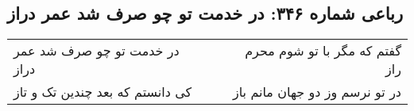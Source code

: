 \begin{center}
\section*{رباعی شماره ۳۴۶: در خدمت تو چو صرف شد عمر دراز}
\label{sec:sh346}
\begin{longtable}{l p{0.5cm} r}
در خدمت تو چو صرف شد عمر دراز
&&
گفتم که مگر با تو شوم محرم راز
\\
کی دانستم که بعد چندین تک و تاز
&&
در تو نرسم وز دو جهان مانم باز
\\
\end{longtable}
\end{center}
